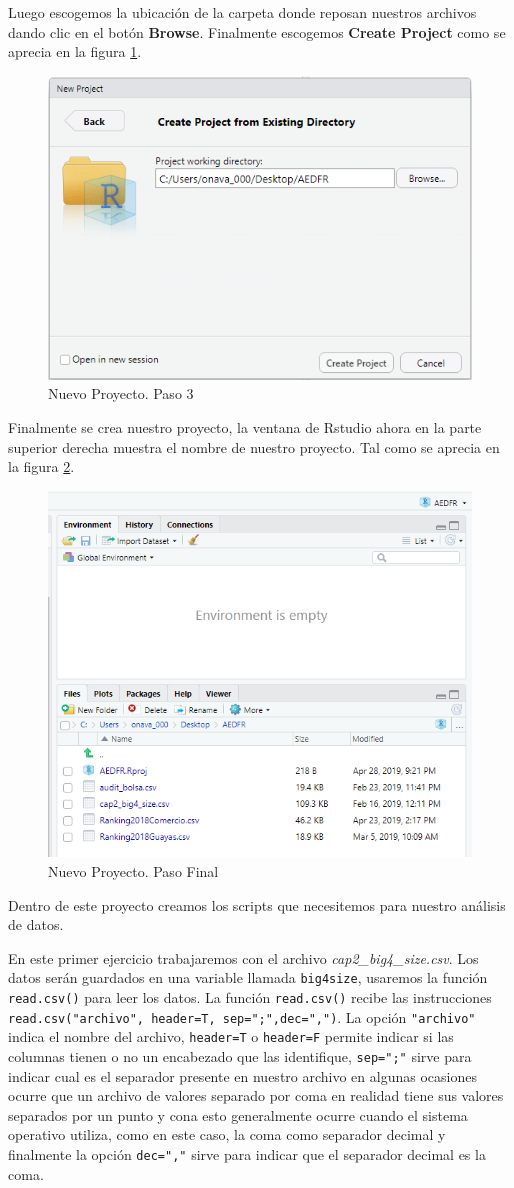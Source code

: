 \documentclass[letterpaper,]{book}
\begin{document}
Luego escogemos la ubicación de la carpeta donde reposan nuestros archivos dando clic en el botón \textbf{Browse}. Finalmente escogemos \textbf{Create Project} como se aprecia en la figura \ref{fig:project3}.

\begin{figure}[!h]

{\centering \includegraphics[width=0.45\linewidth]{project3} 

}

\caption{Nuevo Proyecto. Paso 3}\label{fig:project3}
\end{figure}

Finalmente se crea nuestro proyecto, la ventana de Rstudio ahora en la parte superior derecha muestra el nombre de nuestro proyecto. Tal como se aprecia en la figura \ref{fig:project4}.

\begin{figure}[!h]

{\centering \includegraphics[width=0.4\linewidth]{project4} 

}

\caption{Nuevo Proyecto. Paso Final}\label{fig:project4}
\end{figure}

Dentro de este proyecto creamos los scripts que necesitemos para nuestro análisis de datos.
\newpage 

En este primer ejercicio trabajaremos con el archivo \emph{cap2\_big4\_size.csv}. Los datos serán guardados en una variable llamada \texttt{big4size}, usaremos la función \texttt{read.csv()} para leer los datos. La función \texttt{read.csv()} recibe las instrucciones \texttt{read.csv("archivo",\ header=T,\ sep=";",dec=",")}. La opción \texttt{"archivo"} indica el nombre del archivo, \texttt{header=T} o \texttt{header=F} permite indicar si las columnas tienen o no un encabezado que las identifique, \texttt{sep=";"} sirve para indicar cual es el separador presente en nuestro archivo en algunas ocasiones ocurre que un archivo de valores separado por coma en realidad tiene sus valores separados por un punto y cona esto generalmente ocurre cuando el sistema operativo utiliza, como en este caso, la coma como separador decimal y finalmente la opción \texttt{dec=","} sirve para indicar que el separador decimal es la coma.
\end{document}
